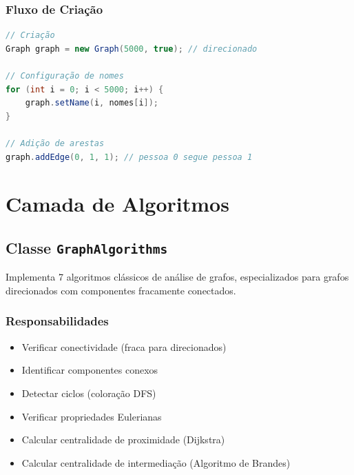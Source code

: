\documentclass[12pt,a4paper]{article}
\begin{document}
    \subsubsection{Fluxo de Criação}

    \begin{lstlisting}[language=Java, caption=Uso da classe Graph]
// Criação
Graph graph = new Graph(5000, true); // direcionado

// Configuração de nomes
for (int i = 0; i < 5000; i++) {
    graph.setName(i, nomes[i]);
}

// Adição de arestas
graph.addEdge(0, 1, 1); // pessoa 0 segue pessoa 1
    \end{lstlisting}

    \newpage

    \section{Camada de Algoritmos}

    \subsection{Classe \texttt{GraphAlgorithms}}

    Implementa 7 algoritmos clássicos de análise de grafos, especializados para grafos direcionados com componentes fracamente conectados.

    \subsubsection{Responsabilidades}

    \begin{itemize}
        \item Verificar conectividade (fraca para direcionados)
        \item Identificar componentes conexos
        \item Detectar ciclos (coloração DFS)
        \item Verificar propriedades Eulerianas
        \item Calcular centralidade de proximidade (Dijkstra)
        \item Calcular centralidade de intermediação (Algoritmo de Brandes)
    \end{itemize}
\end{document}
